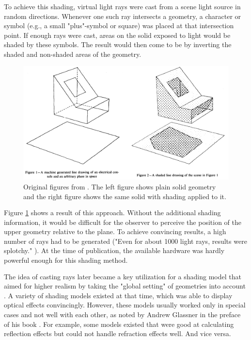 To achieve this shading, virtual light rays were cast from a scene light source in random directions. Whenever one such ray intersects a geometry, a character or symbol (e.g., a small "plus"-symbol or square) was placed at that intersection point. If enough rays were cast, areas on the solid exposed to light would be shaded by these symbols.
The result would then come to be by inverting the shaded and non-shaded areas of the geometry.

\begin{figure}
	\centering
	\includegraphics[width=1\linewidth]{img/1 fundamentals/appel_comp}
	\caption{Original figures from \cite{appel1968some}. The left figure shows plain solid geometry and the right figure shows the same solid with shading applied to it.}
	\label{fig:appel_paper}
\end{figure}

Figure \ref{fig:appel_paper} shows a result of this approach. Without the additional shading information, it would be difficult for the observer to perceive the position of the upper geometry relative to the plane. To achieve convincing results, a high number of rays had to be generated ("Even for about 1000 light rays, results were splotchy." \cite[p 3]{appel1968some}). At the time of publication, the available hardware was hardly powerful enough for this shading method.

The idea of casting rays later became a key utilization for a shading model that aimed for higher realism by taking the "global setting" of geometries into account \cite{whitted1979improved}. A variety of shading models existed at that time, which was able to display optical effects convincingly. However, these models usually worked only in special cases and not well with each other, as noted by Andrew Glassner in the preface of his book  \cite{glassner1989introduction}. For example, some models existed that were good at calculating reflection effects but could not handle refraction effects well. And vice versa. 

